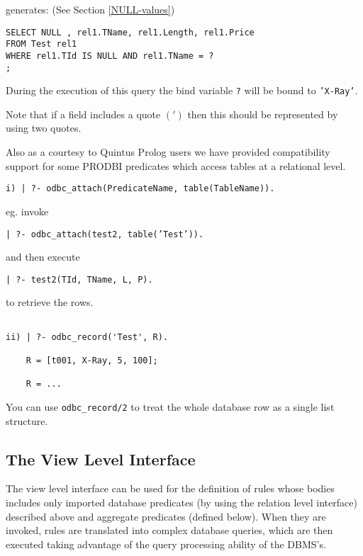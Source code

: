 generates: (See Section \ref{NULL-values})

\begin{verbatim}
SELECT NULL , rel1.TName, rel1.Length, rel1.Price
FROM Test rel1
WHERE rel1.TId IS NULL AND rel1.TName = ?
;
\end{verbatim}

During the execution of this query the bind variable {\tt ?} will be bound
to {\tt 'X-Ray'}.\newline

Note that if a field includes a quote $(')$ then this should be represented by
using two quotes.

Also as a courtesy to Quintus Prolog users we have provided
compatibility support for some PRODBI predicates which access tables
at a relational level.

\begin{verbatim}
i) | ?- odbc_attach(PredicateName, table(TableName)).
\end{verbatim}

eg. invoke 
\begin{center}
{\tt | ?- odbc\_attach(test2, table('Test')).} 
\end{center}
and then execute 
\begin{center}
{\tt | ?- test2(TId, TName, L, P).}
\end{center}
to retrieve the rows.
\begin{verbatim}

ii) | ?- odbc_record('Test', R).

    R = [t001, X-Ray, 5, 100];

    R = ...

\end{verbatim}
    You can use {\tt odbc\_record/2} to treat the whole database row as a 
single list structure.

\subsection{The View Level Interface}

The view level interface can be used for the definition of rules
whose bodies includes only imported database predicates (by using the
relation level interface) described above and aggregate predicates
(defined below).  When they are invoked, rules are translated into complex
database queries, which are then executed taking advantage of the query
processing ability of the DBMS's.

